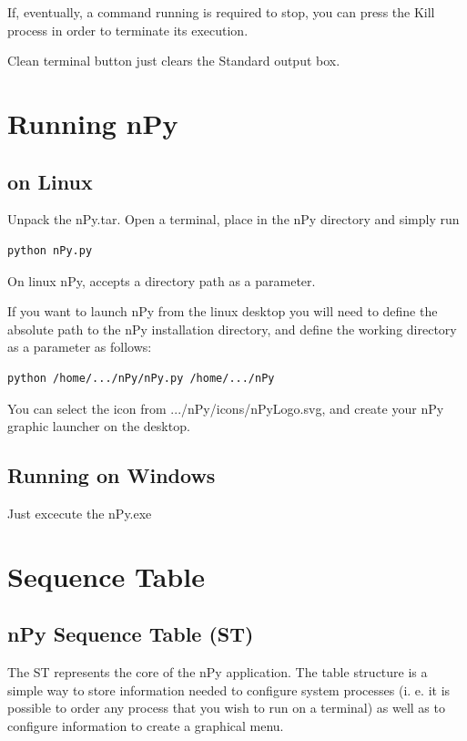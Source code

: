 \documentclass[a4paper,10pt]{article}
\begin{document}
If, eventually, a command running is required to stop, you can press the Kill process in order to terminate its execution.

Clean terminal button just clears the Standard output box.

\section{Running nPy}

\subsection{on Linux}

Unpack the nPy.tar. Open a terminal, place in the nPy directory and simply run

\begin{verbatim}
python nPy.py 
\end{verbatim}

On linux nPy, accepts a directory path as a parameter.

If you want to launch nPy from the linux desktop you will need to define the absolute path to the nPy installation directory, and define the working directory as a parameter as follows:

\begin{verbatim}
python /home/.../nPy/nPy.py /home/.../nPy
\end{verbatim}

You can select the icon from .../nPy/icons/nPyLogo.svg, and create your nPy graphic launcher on the desktop. 

\subsection{Running on Windows}

Just excecute the nPy.exe

\section{Sequence Table}

\subsection{nPy Sequence Table (ST)}

The ST represents the core of the nPy application. The table structure is a simple way to store information needed to configure system processes (i. e.  it is possible to order any process that you wish to run on a terminal) as well as to configure information to create a graphical menu.
\end{document}
